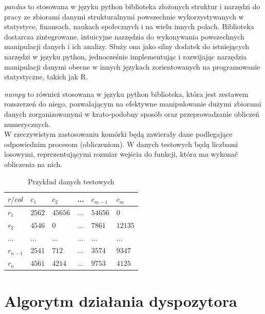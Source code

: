 \documentclass[brudnopis]{xmgr}
\begin{document}
\emph{pandas} to stosowana w języku python biblioteka złożonych struktur i narzędzi do pracy ze zbiorami danymi strukturalnymi powszechnie wykorzystywanych w statystyce, finansach, naukach społecznych i na wielu innych polach. Biblioteka dostarcza zintegrowane, intuicyjne narzędzia do wykonywania powszechnych manipulacji danych i ich analizy. Służy ona jako silny dodatek do istniejących narzędzi w języku python, jednocześnie implementując i rozwijając narzędzia manipulacji danymi obecne w innych językach zorientowanych na programowanie statystyczne, takich jak R. \cite{PANDAS1:2011:X}\cite{PANDAS2:2020:X}

\emph{numpy} to również stosowana w języku python biblioteka, która jest zestawem rozszerzeń do niego, pozwalającym na efektywne manipulowanie dużymi zbiorami danych zorganizowanymi w krato-podobny sposób oraz przeprowadzanie obliczeń numerycznych. \cite{NUMPY1:2020:X}\cite{NUMPY2:1999:X}
\medskip\\

W rzeczywistym zastosowaniu komórki będą zawierały dane podlegające odpowiednim procesom (obliczeniom).
W danych testowych będą liczbami losowymi, reprezentującymi rozmiar wejścia do funkcji, która ma wykonać obliczenia na nich.
\medskip\\

\begin{table}[!tbh]
\begin{tabular}{|l|l|l|l|l|l|} \hline
$r / col$   & $c_1$     & $c_2$     & ...   & $c_{m-1}$ & $c_{m}$   \\ \hline
$r_1$       & $2562$    & $45656$   & ...   & $54656$   & $0$       \\ \hline
$r_2$       & $4546$    & $0$       & ...   & $7861$    & $12135$   \\ \hline
$...$       & $...$     & $...$     & $...$ & $...$     & $...$     \\ \hline
$r_{n-1}$   & $2541$   & $712$      & ...   & $3574$    & $9347$    \\ \hline
$r_{n}$     & $4561$   & $4214$     & ...   & $9753$    & $4125$    \\ \hline
\end{tabular}
\caption{Przykład danych testowych\label{tab:example-sched-out}}
\end{table}

\chapter{Algorytm działania dyspozytora}
\end{document}
